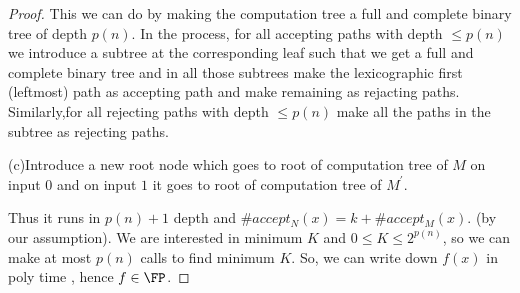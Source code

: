 \documentclass[11pt]{article}
\begin{document}
\begin{proof}
This we can do by making the computation tree a full and complete binary tree of depth $p(n)$. In the
process, for all accepting paths with depth $\le p(n)$ we introduce a subtree at the corresponding leaf 
such that we get a full and complete binary tree and in all those subtrees make the lexicographic first
(leftmost) path as accepting path and make remaining as rejacting paths. Similarly,for all rejecting paths
with depth $\le p(n)$ make all the paths in the subtree as rejecting paths.\

(c)Introduce a new root node which goes to root of computation tree of $M$ on input $0$ and on input $1$
it goes to root of computation tree of $M^{'}$.\
 
Thus it runs in $p(n)+1$ depth and $\# accept_N(x)=k+\# accept_M(x)$.
(by our assumption). We are interested in minimum $K$ and $0\le K \le 2^{p(n)}$, so we can make at most $p(n)$
calls to find minimum $K$. So, we can write down $f(x)$ in poly time , hence $f\in\FP$.

\end{proof}
\end{document}
